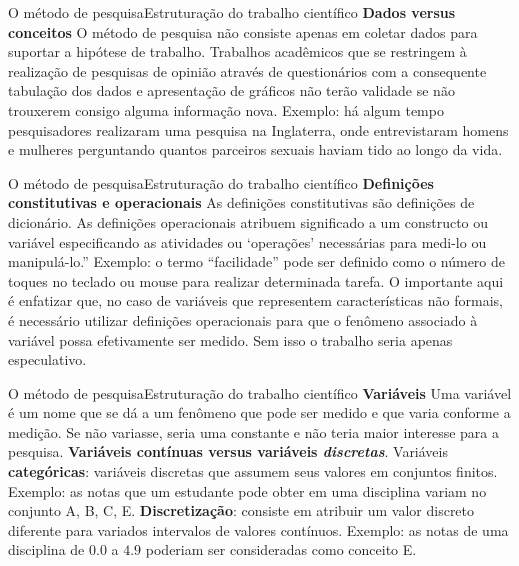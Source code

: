 \documentclass[t]{beamer}
\begin{document}

\begin{ftst}{O método de pesquisa}{Estruturação do trabalho científico}
\justifying
\textbf{Dados versus conceitos}
\vone
O método de pesquisa não consiste apenas em coletar dados para suportar a hipótese de trabalho. 
\vone
Trabalhos acadêmicos que se restringem à realização de pesquisas de opinião através de questionários com a consequente tabulação dos dados e apresentação de gráficos não terão validade se não trouxerem consigo alguma informação nova.
\vone
Exemplo: há algum tempo pesquisadores realizaram uma pesquisa na Inglaterra, onde entrevistaram homens e mulheres perguntando quantos parceiros sexuais haviam tido ao longo da vida.
\end{ftst}


\begin{ftst}{O método de pesquisa}{Estruturação do trabalho científico}
\justifying
\textbf{Definições constitutivas e operacionais}
\vone
As definições constitutivas são definições de dicionário. 
\vone
As definições operacionais atribuem significado a um constructo ou variável especificando as atividades ou ‘operações’ necessárias para medi-lo ou manipulá-lo.”
\vone
Exemplo: o termo “facilidade” pode ser definido como o número de toques no teclado ou mouse para realizar determinada tarefa.
\vone
O importante aqui é enfatizar que, no caso de variáveis que representem características não formais, é necessário utilizar definições operacionais para que o fenômeno associado à variável possa efetivamente ser medido. Sem isso o trabalho seria apenas especulativo.
\end{ftst}


\begin{ftst}{O método de pesquisa}{Estruturação do trabalho científico}
\justifying
\textbf{Variáveis}
\vone
Uma variável é um nome que se dá a um fenômeno que pode ser medido e que varia conforme a medição. Se não variasse, seria uma constante e não teria maior
interesse para a pesquisa.
\vone
\textbf{Variáveis \textbf{contínuas} versus variáveis \textit{discretas}}.
\vone
Variáveis \textbf{categóricas}: variáveis discretas que assumem seus valores em conjuntos finitos. Exemplo: as notas que um estudante pode obter em uma disciplina variam no conjunto {A, B, C, E}.
\vone
\textbf{Discretização}: consiste em atribuir um valor discreto diferente para variados intervalos de valores contínuos. Exemplo: as notas de uma disciplina de $0.0$
a $4.9$ poderiam ser consideradas como conceito E.

\end{ftst}
\end{document}
